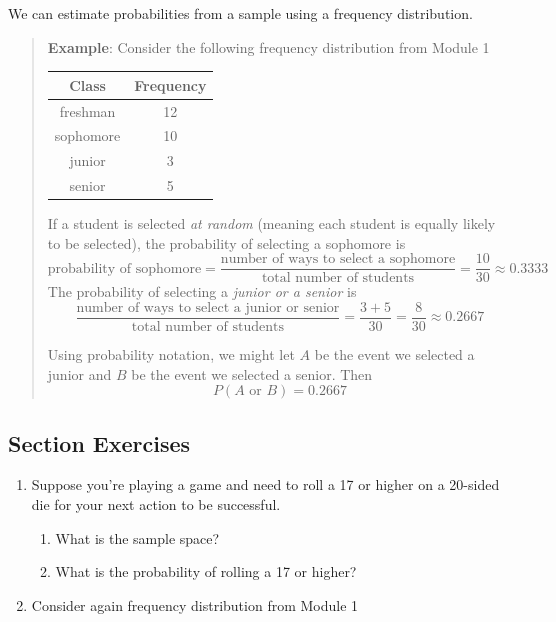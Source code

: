 \documentclass[
]{book}
\providecommand{\tightlist}{%
  \setlength{\itemsep}{0pt}\setlength{\parskip}{0pt}}
\begin{document}
We can estimate probabilities from a sample using a frequency distribution.

\begin{quote}
\textbf{Example}: Consider the following frequency distribution from Module 1

\begin{longtable}[]{@{}cc@{}}
\toprule\noalign{}
Class & Frequency \\
\midrule\noalign{}
\endhead
\bottomrule\noalign{}
\endlastfoot
freshman & 12 \\
sophomore & 10 \\
junior & 3 \\
senior & 5 \\
\end{longtable}

If a student is selected \emph{at random} (meaning each student is equally likely to be selected), the probability of selecting a sophomore is \[\text{probability of sophomore} = \frac{\text{number of ways to select a sophomore}}{\text{total number of students}} = \frac{10}{30} \approx 0.3333\] The probability of selecting a \emph{junior or a senior} is \[\frac{\text{number of ways to select a junior or senior}}{\text{total number of students}} = \frac{3+5}{30} = \frac{8}{30} \approx 0.2667\]

Using probability notation, we might let \(A\) be the event we selected a junior and \(B\) be the event we selected a senior. Then \[P(A \text{ or } B) = 0.2667\]
\end{quote}

\subsection*{Section Exercises}\label{section-exercises-9}

\begin{enumerate}
\def\labelenumi{\arabic{enumi}.}
\tightlist
\item
  Suppose you're playing a game and need to roll a 17 or higher on a 20-sided die for your next action to be successful.

  \begin{enumerate}
  \def\labelenumii{\alph{enumii}.}
  \tightlist
  \item
    What is the sample space?
  \item
    What is the probability of rolling a 17 or higher?
  \end{enumerate}
\item
  Consider again frequency distribution from Module 1
\end{enumerate}
\end{document}
